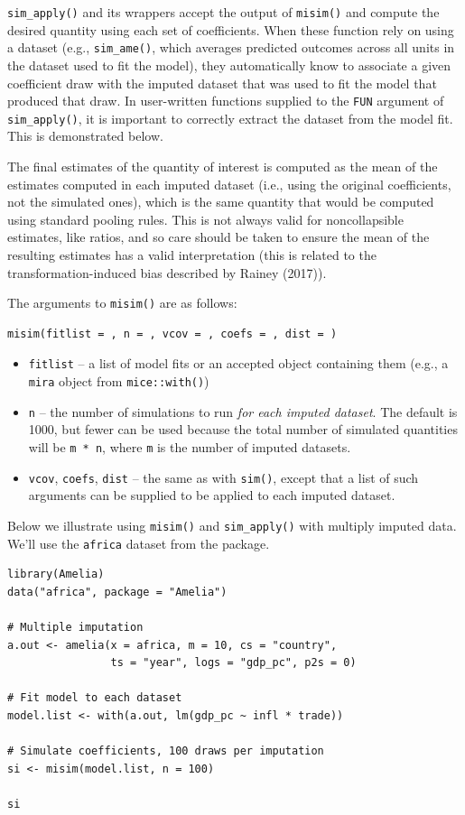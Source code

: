 \texttt{sim\_apply()} and its wrappers accept the output of \texttt{misim()} and compute the desired quantity using each set of coefficients. When these function rely on using a dataset (e.g., \texttt{sim\_ame()}, which averages predicted outcomes across all units in the dataset used to fit the model), they automatically know to associate a given coefficient draw with the imputed dataset that was used to fit the model that produced that draw. In user-written functions supplied to the \texttt{FUN} argument of \texttt{sim\_apply()}, it is important to correctly extract the dataset from the model fit. This is demonstrated below.

The final estimates of the quantity of interest is computed as the mean of the estimates computed in each imputed dataset (i.e., using the original coefficients, not the simulated ones), which is the same quantity that would be computed using standard pooling rules. This is not always valid for noncollapsible estimates, like ratios, and so care should be taken to ensure the mean of the resulting estimates has a valid interpretation (this is related to the transformation-induced bias described by Rainey (2017)).

The arguments to \texttt{misim()} are as follows:

\begin{verbatim}
misim(fitlist = , n = , vcov = , coefs = , dist = )
\end{verbatim}

\begin{itemize}
\item
  \texttt{fitlist} -- a list of model fits or an accepted object containing them (e.g., a \texttt{mira} object from \texttt{mice::with()})
\item
  \texttt{n} -- the number of simulations to run \emph{for each imputed dataset}. The default is 1000, but fewer can be used because the total number of simulated quantities will be \texttt{m\ *\ n}, where \texttt{m} is the number of imputed datasets.
\item
  \texttt{vcov}, \texttt{coefs}, \texttt{dist} -- the same as with \texttt{sim()}, except that a list of such arguments can be supplied to be applied to each imputed dataset.
\end{itemize}

Below we illustrate using \texttt{misim()} and \texttt{sim\_apply()} with multiply imputed data. We'll use the \texttt{africa} dataset from the  package.

\begin{verbatim}
library(Amelia)
data("africa", package = "Amelia")

# Multiple imputation
a.out <- amelia(x = africa, m = 10, cs = "country",
                ts = "year", logs = "gdp_pc", p2s = 0)

# Fit model to each dataset
model.list <- with(a.out, lm(gdp_pc ~ infl * trade))

# Simulate coefficients, 100 draws per imputation
si <- misim(model.list, n = 100)

si
\end{verbatim}

